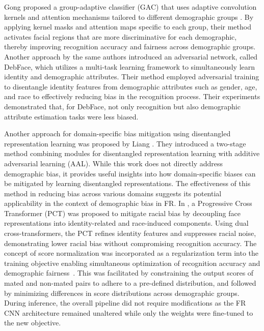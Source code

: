 Gong \etal proposed a group-adaptive classifier (GAC) that uses adaptive
convolution kernels and attention mechanisms tailored to different demographic
groups \cite{gong2021mitigating}. By applying kernel masks and attention maps
specific to each group, their method activates facial regions that are more
discriminative for each demographic, thereby improving recognition accuracy and
fairness across demographic groups. 
%
Another approach by the same authors \cite{gong2020jointly} introduced an
adversarial network, called DebFace, which utilizes a multi-task learning
framework to simultaneously learn identity and demographic attributes. Their
method employed adversarial training to disentangle identity features from
demographic attributes such as gender, age, and race to effectively reducing
bias in the recognition process. Their experiments demonstrated that, for
DebFace, not only recognition but also demographic attribute estimation tasks
were less biased.



Another approach for domain-specific bias mitigation using disentangled
representation learning was proposed by Liang \etal \cite{liang2019additive}.
They introduced a two-stage method combining modules for disentangled
representation learning with additive adversarial learning (AAL). While this
work does not directly address demographic bias, it provides useful insights
into how domain-specific biases can be mitigated by learning disentangled
representations. The effectiveness of this method in reducing bias across
various domains suggests its potential applicability in the context of
demographic bias in FR.
%
In \cite{li2021learning}, a Progressive Cross Transformer (PCT) was proposed to
mitigate racial bias by decoupling face representations into identity-related
and race-induced components. Using dual cross-transformers, the PCT refines
identity features and suppresses racial noise, demonstrating lower racial bias
without compromising recognition accuracy.
%
The concept of score normalization was incorporated as a regularization term
into the training objective  enabling simultaneous optimization of recognition
accuracy and demographic fairness~\cite{kotwal2024WACV}. This was facilitated
by constraining the output scores of mated and non-mated pairs to adhere to a
pre-defined distribution, and followed by minimizing differences in score
distributions across demographic groups. During inference, the overall
pipeline did not require modifications as the FR CNN architecture remained
unaltered while only the weights were fine-tuned to the new objective.

